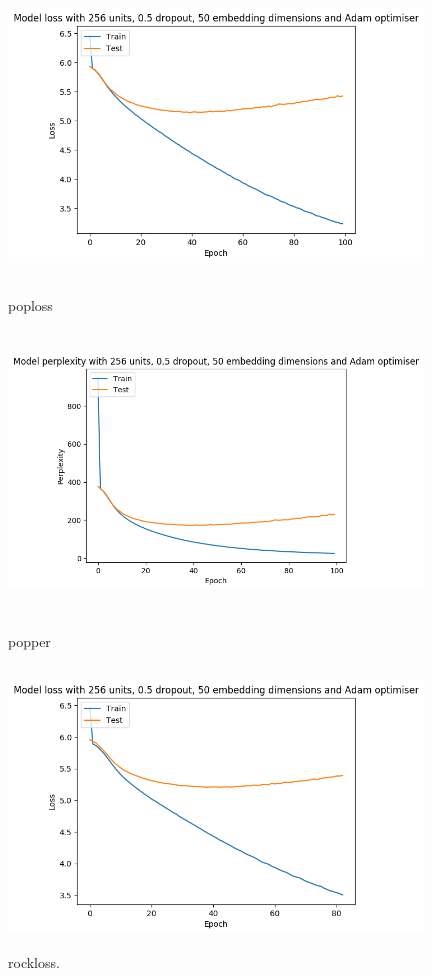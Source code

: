 \begin{figure}[ht]
	\centering
	\includegraphics[width=11cm, height=7.5cm]{./figures/poploss}
	\caption{poploss}
	\label{fig:poploss}


	\includegraphics[width=11cm, height=7.5cm]{./figures/popper}
	\caption{popper}
	\label{fig:popper}

	\includegraphics[width=11cm, height=7.5cm]{./figures/rockloss}
	\caption{rockloss.}
	\label{fig:poploss}
\end{figure}


